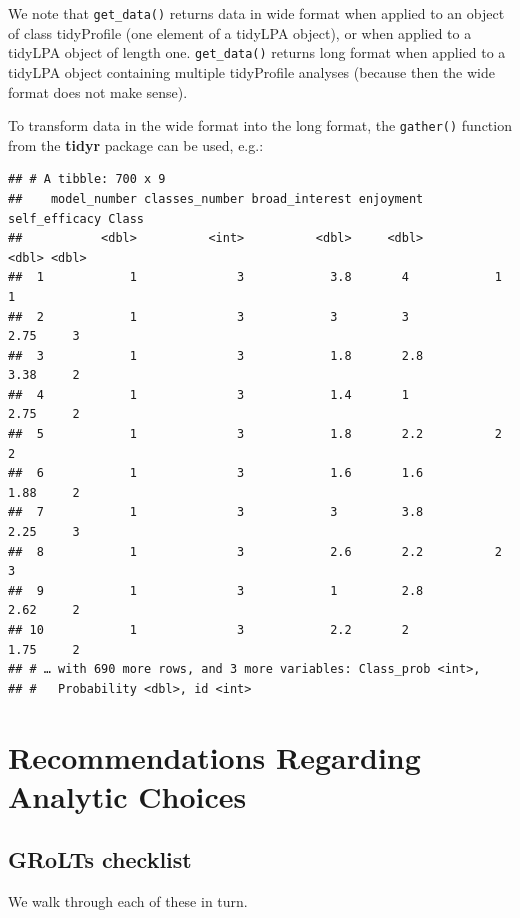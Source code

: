 \documentclass[man]{apa6}
\begin{document}
We note that \texttt{get\_data()} returns data in wide format when applied to an object
of class tidyProfile (one element of a tidyLPA object), or when applied to a
tidyLPA object of length one. \texttt{get\_data()} returns long format when applied to a
tidyLPA object containing multiple tidyProfile analyses (because then the wide
format does not make sense).

To transform data in the wide format into the long format, the \texttt{gather()}
function from the \textbf{tidyr} package can be used, e.g.:

\begin{verbatim}
## # A tibble: 700 x 9
##    model_number classes_number broad_interest enjoyment self_efficacy Class
##           <dbl>          <int>          <dbl>     <dbl>         <dbl> <dbl>
##  1            1              3            3.8       4            1        1
##  2            1              3            3         3            2.75     3
##  3            1              3            1.8       2.8          3.38     2
##  4            1              3            1.4       1            2.75     2
##  5            1              3            1.8       2.2          2        2
##  6            1              3            1.6       1.6          1.88     2
##  7            1              3            3         3.8          2.25     3
##  8            1              3            2.6       2.2          2        3
##  9            1              3            1         2.8          2.62     2
## 10            1              3            2.2       2            1.75     2
## # … with 690 more rows, and 3 more variables: Class_prob <int>,
## #   Probability <dbl>, id <int>
\end{verbatim}

\hypertarget{recommendations-regarding-analytic-choices}{%
\section{Recommendations Regarding Analytic Choices}\label{recommendations-regarding-analytic-choices}}

\hypertarget{grolts-checklist}{%
\subsection{GRoLTs checklist}\label{grolts-checklist}}

\hypertarget{htmlwidget-5db543d8ea5b00cc330c}{}

We walk through each of these in turn.
\end{document}
